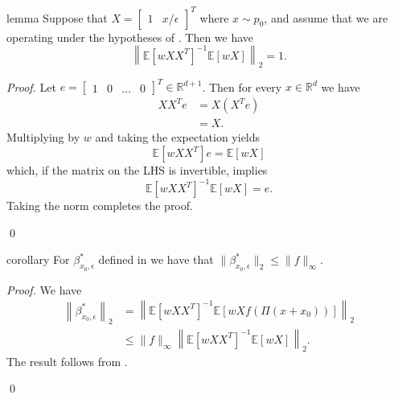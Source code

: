 \documentclass[11pt]{article}
\begin{document}
\begin{restatable}{lemma}{} \label{lemma: pnorm bound} Suppose that $X = \begin{bmatrix}
    1 & x/\epsilon
\end{bmatrix}^T$ where $x \sim p_0$, and assume that we are operating under the hypotheses of . Then we have
\begin{equation}
   \left\|\mathbb{E}[wXX^{T}]^{-1}\mathbb{E}[wX]\right\|_2 =  1.
\end{equation}
\end{restatable}
\noindent \textit{Proof.} Let $e = \begin{bmatrix}
    1 & 0 & \dots & 0
\end{bmatrix}^T \in \mathbb{R}^{d+1}$. Then for every $x \in \mathbb{R}^d$ we have
\begin{align*}
    XX^Te &= X(X^Te) \\
    &= X.
\end{align*}
Multiplying by $w$ and taking the expectation yields
\[\mathbb{E}[wXX^T]e = \mathbb{E}[wX]\]
which, if the matrix on the LHS is invertible, implies
\[\mathbb{E}[wXX^T]^{-1}\mathbb{E}[wX] = e.\]
Taking the norm completes the proof.

\qed{}

\begin{restatable}{corollary}{} \label{corollary: population beta norm bound}
For $\beta^*_{x_0, \epsilon}$ defined in  we have that $\|\beta^*_{x_0, \epsilon}\|_2 \leq \|f\|_{\infty}$.     
\end{restatable}
\noindent \textit{Proof.} We have
\begin{align*}
    \left\|\beta^*_{x_0, \epsilon}\right\|_2 &= \left\|\mathbb{E}\left[wXX^T\right]^{-1}\mathbb{E}\left[wXf(\Pi(x+x_0))\right]\right\|_2 \\
    &\leq \|f\|_\infty \left\|\mathbb{E}\left[wXX^T\right]^{-1}\mathbb{E}\left[wX\right]\right\|_2.
\end{align*}
The result follows from .

\qed{}
\end{document}

